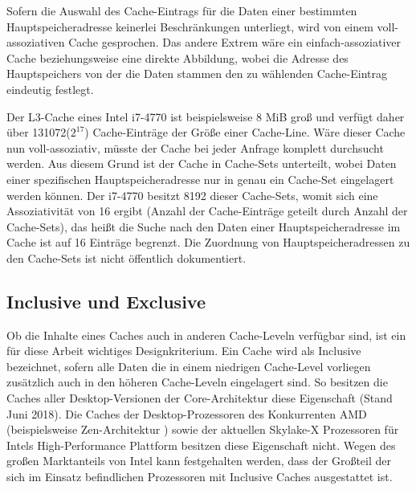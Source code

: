 Sofern die Auswahl des Cache-Eintrags für die Daten einer bestimmten Hauptspeicheradresse keinerlei Beschränkungen unterliegt, wird von einem voll-assoziativen Cache gesprochen. 
Das andere Extrem wäre ein einfach-assoziativer Cache beziehungsweise eine direkte Abbildung, wobei die Adresse des Hauptspeichers von der die Daten stammen den zu wählenden Cache-Eintrag eindeutig festlegt.

Der L3-Cache eines Intel i7-4770 ist beispielsweise 8 MiB groß und verfügt daher über 131072($2^{17}$) Cache-Einträge der Größe einer Cache-Line. 
Wäre dieser Cache nun voll-assoziativ, müsste der Cache bei jeder Anfrage komplett durchsucht werden. Aus diesem Grund ist der Cache in Cache-Sets unterteilt, wobei Daten einer spezifischen Hauptspeicheradresse nur in genau ein Cache-Set eingelagert werden können. 
Der i7-4770 besitzt 8192 dieser Cache-Sets, womit sich eine Assoziativität von 16 ergibt (Anzahl der Cache-Einträge geteilt durch Anzahl der Cache-Sets), das heißt die Suche nach den Daten einer Hauptspeicheradresse im Cache ist auf 16 Einträge begrenzt. 
Die Zuordnung von Hauptspeicheradressen zu den Cache-Sets ist nicht öffentlich dokumentiert.


\subsection{Inclusive und Exclusive}
Ob die Inhalte eines Caches auch in anderen Cache-Leveln verfügbar sind, ist ein für diese Arbeit wichtiges Designkriterium. Ein Cache wird als Inclusive bezeichnet, sofern alle Daten die in einem niedrigen Cache-Level vorliegen zusätzlich auch in den höheren Cache-Leveln eingelagert sind. 
So besitzen die Caches aller Desktop-Versionen der Core-Architektur diese Eigenschaft (Stand Juni 2018). 
Die Caches der Desktop-Prozessoren des Konkurrenten AMD (beispielsweise Zen-Architektur \cite{CacheRyzen}) sowie der aktuellen Skylake-X Prozessoren \cite{CacheSkylakeX} für Intels High-Performance Plattform besitzen diese Eigenschaft nicht.
Wegen des großen Marktanteils von Intel kann festgehalten werden, dass der Großteil der sich im Einsatz befindlichen Prozessoren mit Inclusive Caches ausgestattet ist.

